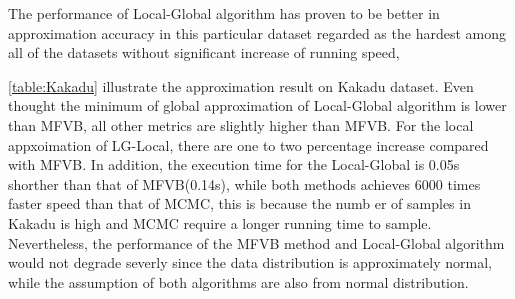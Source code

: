 The performance of Local-Global algorithm has proven to be better in approximation accuracy in this particular dataset regarded as the hardest among all of the datasets without significant increase of running speed,
\begin{table}[!h]
	\caption{Experiment Result on Kakadu dataset}
	\label{table:Kakadu}
\end{table}
\newpage
\autoref{table:Kakadu} illustrate the approximation result on Kakadu dataset. Even thought the minimum of global approximation of Local-Global algorithm is lower than MFVB, all other metrics are slightly higher than MFVB. For the local appxoimation of LG-Local, there are one to two percentage increase compared with MFVB. In addition, the execution time for the Local-Global is 0.05s shorther than that of MFVB(0.14s), while both methods achieves 6000 times faster speed than that of MCMC, this is because the numb er of samples in Kakadu is high and MCMC require a longer running time to sample. Nevertheless, the performance of the MFVB method and Local-Global algorithm would not degrade severly since the data distribution is approximately normal, while the assumption of both algorithms are also from normal distribution.
\newpage
\begin{table}[!h]
	\caption{Experiment Result on bodyfat dataset}
	\label{table:bodyfat}
\end{table}

